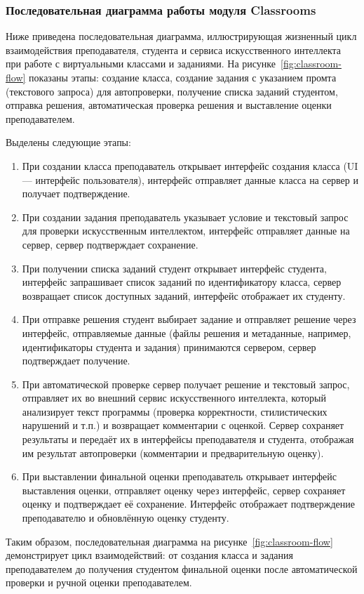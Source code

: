 \subsubsection{Последовательная диаграмма работы модуля Classrooms}
Ниже приведена последовательная диаграмма, иллюстрирующая жизненный цикл взаимодействия преподавателя, студента и сервиса искусственного интеллекта при работе с виртуальными классами и заданиями. На рисунке~\ref{fig:classroom-flow} показаны этапы: создание класса, создание задания с указанием промта (текстового запроса) для автопроверки, получение списка заданий студентом, отправка решения, автоматическая проверка решения и выставление оценки преподавателем.

Выделены следующие этапы:

\begin{enumerate}
    \item При создании класса преподаватель открывает интерфейс создания класса (UI — интерфейс пользователя), интерфейс отправляет данные класса на сервер и получает подтверждение.
    \item При создании задания преподаватель указывает условие и текстовый запрос для проверки искусственным интеллектом, интерфейс отправляет данные на сервер, сервер подтверждает сохранение.
    \item При получении списка заданий студент открывает интерфейс студента, интерфейс запрашивает список заданий по идентификатору класса, сервер возвращает список доступных заданий, интерфейс отображает их студенту.
    \item При отправке решения студент выбирает задание и отправляет решение через интерфейс, отправляемые данные (файлы решения и метаданные, например, идентификаторы студента и задания) принимаются сервером, сервер подтверждает получение.
    \item При автоматической проверке сервер получает решение и текстовый запрос, отправляет их во внешний сервис искусственного интеллекта, который анализирует текст программы (проверка корректности, стилистических нарушений и т.п.) и возвращает комментарии с оценкой. Сервер сохраняет результаты и передаёт их в интерфейсы преподавателя и студента, отображая им результат автопроверки (комментарии и предварительную оценку).
    \item При выставлении финальной оценки преподаватель открывает интерфейс выставления оценки, отправляет оценку через интерфейс, сервер сохраняет оценку и подтверждает её сохранение. Интерфейс отображает подтверждение преподавателю и обновлённую оценку студенту.
\end{enumerate}

Таким образом, последовательная диаграмма на рисунке~\ref{fig:classroom-flow} демонстрирует цикл взаимодействий: от создания класса и задания преподавателем до получения студентом финальной оценки после автоматической проверки и ручной оценки преподавателем.
